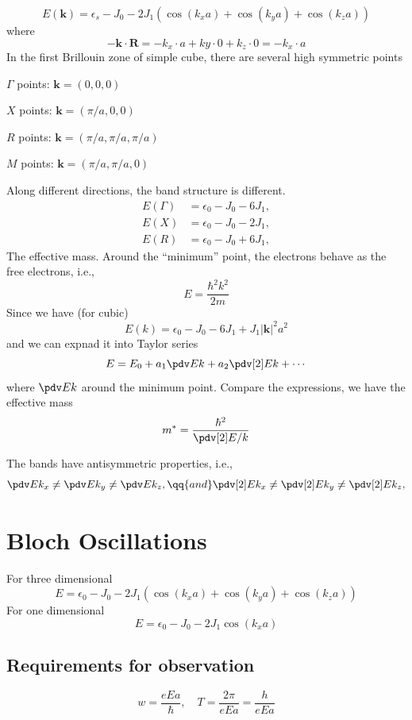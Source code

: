 \begin{example}
  \[
    E(\bm k) = \epsilon_s - J_0 - 2J_1(\cos(k_xa) + \cos(k_ya) + \cos(k_za))
  \]
  where
  \[
    -\bm k \cdot \bm R = -k_x \cdot a + ky \cdot 0 + k_z \cdot 0 = -k_x \cdot a
  \]
  In the first Brillouin zone of simple cube, there are several high symmetric
  points
  \begin{enumext}[columns = 2]
    \item $\Gamma$ points: $\bm k = (0,0,0)$
    \item $X$ points: $\bm k = (\pi/a,0,0)$
    \item $R$ points: $\bm k = (\pi/a,\pi/a,\pi/a)$
    \item $M$ points: $\bm k = (\pi/a,\pi/a,0)$
  \end{enumext}
  Along different directions, the band structure is different.
  \begin{align}
    E(\Gamma) & = \epsilon_0 - J_0 - 6J_1,\\
    E(X)      & = \epsilon_0 - J_0 - 2J_1,\\
    E(R)      & = \epsilon_0 - J_0 + 6J_1,
  \end{align}
  The effective mass. Around the ``minimum'' point, the electrons behave as the
  free electrons, i.e.,
  \[
    E = \frac{\hbar^2k^2}{2m}
  \]
  Since we have (for cubic)
  \[
    E(k) = \epsilon_0 - J_0 - 6J_1 + J_1|\bm k|^2 a^2
  \]
  and we can expnad it into Taylor series
  \[
    E = E_0 + a_1\pdv Ek + a_2\pdv[2]Ek + \cdots
  \]
  where $\pdv Ek$ around the minimum point. Compare the expressions, we have the effective mass
  \[
    m^* = \frac{\hbar^2}{\pdv[2]E/k}
  \]
\end{example}
The bands have antisymmetric properties, i.e.,
\[
  \pdv E{k_x} \neq \pdv E{k_y} \neq \pdv E{k_z}, \qq{and}
  \pdv[2] E{k_x} \neq \pdv[2] E{k_y} \neq \pdv[2] E{k_z},
\]

\section{Bloch Oscillations}

For three dimensional
\[
  E = \epsilon_0 - J_0 - 2J_1(\cos(k_xa) + \cos(k_ya) + \cos(k_za))
\]
For one dimensional
\[
  E = \epsilon_0 - J_0 - 2J_1 \cos(k_xa)
\]

\subsection{Requirements for observation}

\[
  w = \frac{eEa}{\hbar}, \quad T = \frac{2\pi}{eEa} = \frac{h}{eEa}
\]